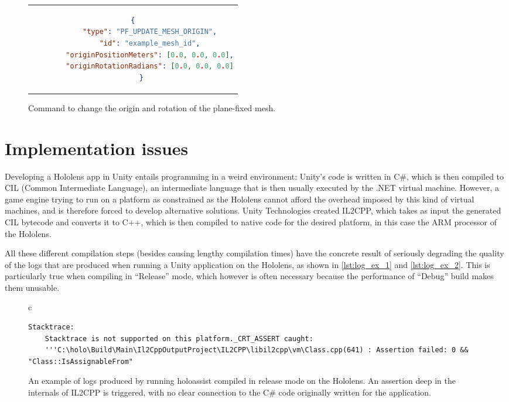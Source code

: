 \begin{figure}
  \centering
  \begin{tabular}{c}
  \begin{lstlisting}[language=json]
    {
        "type": "PF_UPDATE_MESH_ORIGIN",
        "id": "example_mesh_id",
        "originPositionMeters": [0.0, 0.0, 0.0],
        "originRotationRadians": [0.0, 0.0, 0.0]
    }
  \end{lstlisting}
  \end{tabular}
  \caption{Command to change the origin and rotation of the plane-fixed mesh.}\label{lst:pf_update}
\end{figure}

\chapter{Implementation issues}

Developing a Hololens app in Unity entails programming in a weird environment: Unity's code is written in C\#, which is then compiled to CIL (Common Intermediate Language), an intermediate language that is then usually executed by the .NET virtual machine. However, a game engine trying to run on a platform as constrained as the Hololens cannot afford the overhead imposed by this kind of virtual machines, and is therefore forced to develop alternative solutions. Unity Technologies created IL2CPP\cite{unity_technologies_unity_nodate-1}, which takes as input the generated CIL bytecode and converts it to C++, which is then compiled to native code for the desired platform, in this case the ARM processor of the Hololens.

All these different compilation steps (besides causing lengthy compilation times) have the concrete result of seriously degrading the quality of the logs that are produced when running a Unity application on the Hololens, as shown in \autoref{lst:log_ex_1} and \autoref{lst:log_ex_2}. This is particularly true when compiling in \enquote{Release} mode, which however is often necessary because the performance of \enquote{Debug} build makes them unusable.

\begin{figure}
  \centering
  \begin{tabular}{c}
  \begin{lstlisting}[]
    Stacktrace:
    Stacktrace is not supported on this platform._CRT_ASSERT caught:
    '''C:\holo\Build\Main\Il2CppOutputProject\IL2CPP\libil2cpp\vm\Class.cpp(641) : Assertion failed: 0 && "Class::IsAssignableFrom"
  \end{lstlisting}
  \end{tabular}
  \caption{An example of logs produced by running \gls{holoassist} compiled in release mode on the Hololens. An assertion deep in the internals of IL2CPP is triggered, with no clear connection to the C\# code originally written for the application.}\label{lst:log_ex_1}
\end{figure}

